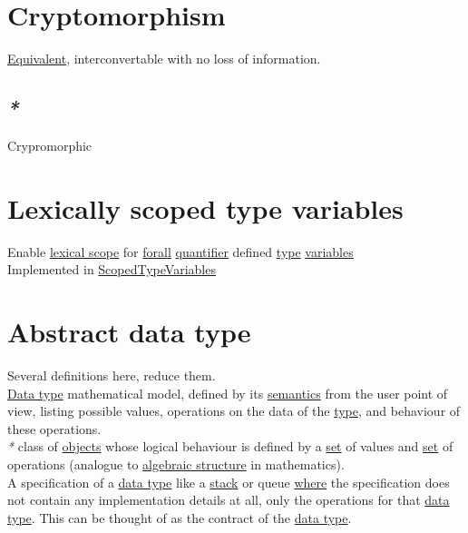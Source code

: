 \documentclass[a4paper,14pt,oneside]{book}
\begin{document}
\chapter{\label{org43576d5}Cryptomorphism}
\label{sec:org8d4098b}

\hyperref[orgd1723ac]{Equivalent}, interconvertable with no loss of information.\\

\section{\emph{*}}
\label{sec:org1f5f36e}

\label{orgd79fe57}Crypromorphic\\

\chapter{\label{orga7a137e}Lexically scoped type variables}
\label{sec:org13075f6}

Enable \hyperref[orgc4161d6]{lexical scope} for \hyperref[orge57fecc]{forall} \hyperref[org382c88a]{quantifier} defined \hyperref[orgdbcea73]{type} \hyperref[org1f76999]{variables}\\

Implemented in \hyperref[orgc25e434]{ScopedTypeVariables}\\

\chapter{\label{org3c67899}Abstract data type}
\label{sec:org44477b4}

Several definitions here, reduce them.\\

\hyperref[org1d671b5]{Data type} mathematical model, defined by its \hyperref[org0fdf3be]{semantics} from the user point of view, listing possible values, operations on the data of the \hyperref[orgdbcea73]{type}, and behaviour of these operations.\\

\emph{*} class of \hyperref[orgc973d87]{objects} whose logical behaviour is defined by a \hyperref[org2ca93d9]{set} of values and \hyperref[org2ca93d9]{set} of operations (analogue to \hyperref[org9905577]{algebraic structure} in mathematics).\\

A specification of a \hyperref[org1d671b5]{data type} like a \hyperref[orgf88051a]{stack} or queue \hyperref[org002404a]{where} the specification does not contain any implementation details at all, only the operations for that \hyperref[org1d671b5]{data type}. This can be thought of as the contract of the \hyperref[org1d671b5]{data type}.\\
\end{document}
